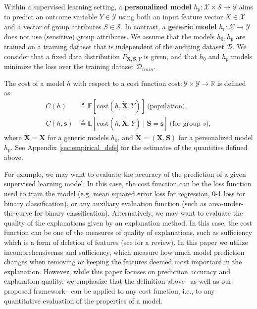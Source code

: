 Within a supervised learning setting, a \textbf{personalized model} $h_p: \mathcal{X} \times \mathcal{S} \rightarrow \mathcal{Y}$ aims to predict an outcome variable $Y \in \mathcal{Y}$ using both an input feature vector $X \in \mathcal{X}$ and a vector of group attributes $S \in \mathcal{S}$. In contrast, a \textbf{generic model} $h_0: \mathcal{X} \rightarrow \mathcal{Y}$ does not use (sensitive) group attributes. We assume that the models $h_0, h_p$ are trained on a training dataset that is independent of the auditing dataset $\mathcal{D}$. We consider that a fixed data distribution $P_{\mathbf{X}, \mathbf{S}, Y}$ is given, and that $h_0$ and $h_p$ models minimize the loss over the training dataset \( \mathcal{D}_{train} \).


\begin{definition}  \label{def:model_cost}
The cost of a model $h$ with respect to a cost function  
$\mathrm{cost}: \mathcal{Y} \times \mathcal{Y} \rightarrow \mathbb{R}$ is defined as:
\begin{equation}
\begin{split}
    C(h) & \triangleq \mathbb{E}[\mathrm{cost}(h, \tilde{\mathbf{X}}, Y)]~\text{(population)}, 
\quad \\
C(h, \mathbf{s}) & \triangleq \mathbb{E}[\mathrm{cost}(h, \tilde{\mathbf{X}}, Y) \mid \mathbf{S}=\mathbf{s}]~\text{(for group $s$)},
\end{split}
\end{equation}
where $\tilde{\mathbf{X}} = \mathbf{X}$ for a generic models $h_0$, and $\tilde{\mathbf{X}} = (\mathbf{X}, \mathbf{S})$ for a personalized model $h_p$. See Appendix \ref{sec:empirical_defs} for the estimates of the quantities defined above.
\end{definition} 

For example, we may want to evaluate the accuracy of the prediction of a given supervised learning model. In this case, the cost function can be the loss function used to train the model (e.g. mean squared error loss for regression, 0-1 loss for binary classification), or any auxiliary evaluation function (such as area-under-the-curve for binary classification).
Alternatively, we may want to evaluate the quality of the explanations given by an explanation method. In this case, the cost function can be one of the measures of quality of explanations, such as sufficiency which is a form of deletion of features (see \citet{Nauta_2023} for a review). In this paper we utilize incomprehensivenss and sufficiency, which measure how much model prediction changes when removing or keeping the features deemed most important in the explanation. However, while this paper focuses on prediction accuracy and explanation quality, we emphasize that the definition above --as well as our proposed framework-- can be applied to any cost function, i.e., to any quantitative evaluation of the properties of a model. 



